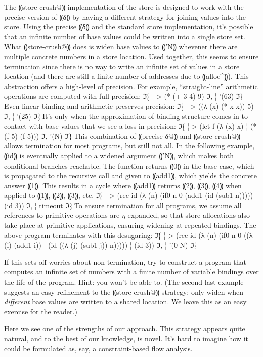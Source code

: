 The ⸨store-crush@⸩ implementation of the store is designed to
work with the precise version of ⸨δ⸩ by having a different
strategy for joining values into the store.  Using the precise
⸨δ⸩ and the standard store implementation, it's possible that
an infinite number of base values could be written into a single store
set.  What ⸨store-crush@⸩ does is widen base values to
⸨'N⸩ whevener there are multiple concrete numbers in a store
location.  Used together, this seems to ensure termination
since there is no way to write an infinite set of values in a
store location (and there are still a finite number of addresses due
to ⸨alloc^⸩).  This abstraction offers a
high-level of precision.  For example, ``straight-line'' arithmetic
operations are computed with full precision:
ℑ⁅
¦ > (* (+ 3 4) 9)
ℑ,
¦ '(63)
ℑ⁆
Even linear binding and arithmetic preserves precision:
ℑ⁅
¦ > ((λ (x) (* x x)) 5)
ℑ,
¦ '(25)
ℑ⁆
It's only when the approximation of binding structure comes in to
contact with base values that we see a loss in precision:
ℑ⁅
¦ > (let f (λ (x) x)
¦     (* (f 5) (f 5)))
ℑ,
'(N)
ℑ⁆
This combination of ⸨precise-δ@⸩ and ⸨store-crush@⸩ allows termination
for most programs, but still not all.
In the following example, ⸨id⸩ is eventually applied to a widened argument ⸨'N⸩,
which makes both conditional branches reachable.
The function returns ⸨0⸩ in the base case,
which is propagated to the recursive call and given to ⸨add1⸩,
which yields the concrete answer ⸨1⸩.
This results in a cycle where ⸨add1⸩ returns ⸨2⸩, ⸨3⸩, ⸨4⸩
when applied to ⸨1⸩, ⸨2⸩, ⸨3⸩, etc.
ℑ⁅
¦ > (rec id (λ (n) (if0 n 0 (add1 (id (sub1 n)))))
¦     (id 3))
ℑ,
¦ timeout
ℑ⁆
To ensure termination for all programs, we assume all references
to primitive operations are $η$-expanded, so that store-allocations also take place
at primitive applications, ensuring widening at repeated bindings.
The above program terminates with this desugaring:
ℑ⁅
¦ > (rec id (λ (n) (if0 n 0 ((λ (i) (add1 i))
¦                            (id ((λ (j) (sub1 j)) n)))))
¦     (id 3))
ℑ,
¦ '(0 N)
ℑ⁆


If this sets off worries about non-termination, try to construct a
program that computes an infinite set of numbers with a finite number
of variable bindings over the life of the program.  Hint: you won't be
able to.  (The second last example suggests an easy refinement to the
⸨store-crush@⸩ strategy: only widen when \emph{different} base
values are written to a shared location.  We leave this as an easy
exercise for the reader.)

Here we see one of the strengths of our approach.  This strategy
appears quite natural, and to the best of our knowledge, is novel.
It's hard to imagine how it could be formulated as, say, a
constraint-based flow analysis.
